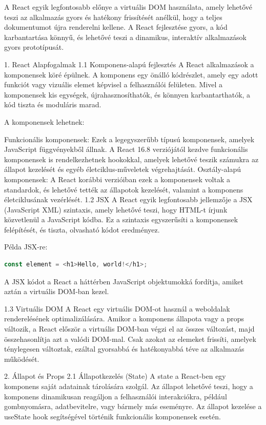 \documentclass[colorlinks]{thesis-kando}
\theoremstyle{definition}
\theoremstyle{remark}
\begin{document}
A React egyik legfontosabb előnye a virtuális DOM használata, amely lehetővé teszi az alkalmazás gyors és hatékony frissítését anélkül, hogy a teljes dokumentumot újra renderelni kellene. A React fejlesztése gyors, a kód karbantartása könnyű, és lehetővé teszi a dinamikus, interaktív alkalmazások gyors prototípusát.

1. React Alapfogalmak
1.1 Komponens-alapú fejlesztés
A React alkalmazások a komponensek köré épülnek. A komponens egy önálló kódrészlet, amely egy adott funkciót vagy vizuális elemet képvisel a felhasználói felületen. Mivel a komponensek kis egységek, újrahasznosíthatók, és könnyen karbantarthatók, a kód tiszta és moduláris marad.

A komponensek lehetnek:

Funkcionális komponensek: Ezek a legegyszerűbb típusú komponensek, amelyek JavaScript függvényekből állnak. A React 16.8 verziójától kezdve funkcionális komponensek is rendelkezhetnek hookokkal, amelyek lehetővé teszik számukra az állapot kezelését és egyéb életciklus-műveletek végrehajtását.
Osztály-alapú komponensek: A React korábbi verzióiban ezek a komponensek voltak a standardok, és lehetővé tették az állapotok kezelését, valamint a komponens életciklusának vezérlését.
1.2 JSX
A React egyik legfontosabb jellemzője a JSX (JavaScript XML) szintaxis, amely lehetővé teszi, hogy HTML-t írjunk közvetlenül a JavaScript kódba. Ez a szintaxis egyszerűsíti a komponensek felépítését, és tiszta, olvasható kódot eredményez.

Példa JSX-re:
\begin{lstlisting}[language=JavaScript]
const element = <h1>Hello, world!</h1>;
\end{lstlisting}
A JSX kódot a React a háttérben JavaScript objektumokká fordítja, amiket aztán a virtuális DOM-ban kezel.

1.3 Virtuális DOM
A React egy virtuális DOM-ot használ a weboldalak renderelésének optimalizálására. Amikor a komponens állapota vagy a props változik, a React először a virtuális DOM-ban végzi el az összes változást, majd összehasonlítja azt a valódi DOM-mal. Csak azokat az elemeket frissíti, amelyek ténylegesen változtak, ezáltal gyorsabbá és hatékonyabbá téve az alkalmazás működését.

2. Állapot és Props
2.1 Állapotkezelés (State)
A state a React-ben egy komponens saját adatainak tárolására szolgál. Az állapot lehetővé teszi, hogy a komponens dinamikusan reagáljon a felhasználói interakciókra, például gombnyomásra, adatbevitelre, vagy bármely más eseményre. Az állapot kezelése a useState hook segítségével történik funkcionális komponensek esetén.
\end{document}
